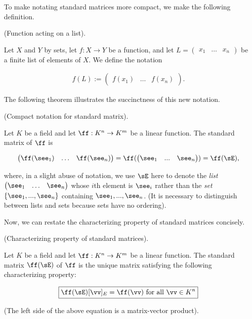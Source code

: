 To make notating standard matrices more compact, we make the following definition.

\begin{defn}
\label{ch::lin_alg::defn::linear_fn_acts_on_vectors}
    (Function acting on a list).
    
    Let $X$ and $Y$ by sets, let $f:X \rightarrow Y$ be a function, and let $L = \begin{pmatrix} x_1 & \hdots & x_n \end{pmatrix}$ be a finite list of elements of $X$. We define the notation
    
    \begin{align*}
        f(L) := \begin{pmatrix} f(x_1) & \hdots & f(x_n) \end{pmatrix}.
    \end{align*}
\end{defn}

The following theorem illustrates the succinctness of this new notation.

\begin{theorem}
    (Compact notation for standard matrix).
    
    Let $K$ be a field and let $\ff:K^n \rightarrow K^m$ be a linear function. The standard matrix of $\ff$ is
    
    \begin{align*}
        \begin{pmatrix} \ff(\see_1) & \hdots & \ff(\see_n) \end{pmatrix} = \ff(\begin{pmatrix} \see_1 & ... & \see_n \end{pmatrix}) = \ff(\sE),
    \end{align*}
    
    where, in a slight abuse of notation, we use $\sE$ here to denote the \textit{list} $\begin{pmatrix} \see_1 & \hdots & \see_n \end{pmatrix}$ whose $i$th element is $\see_i$ rather than the \textit{set} $\{\see_1, ..., \see_n\}$ containing $\see_1, ..., \see_n$. (It is necessary to distinguish between lists and sets because sets have no ordering).
\end{theorem}

Now, we can restate the characterizing property of standard matrices concisely.

\begin{theorem}
    (Characterizing property of standard matrices).
    \label{ch::lin_alg::thm::characterizing_property_of_standard_matrix}
    
    Let $K$ be a field and let $\ff:K^n \rightarrow K^m$ be a linear function. The standard matrix $\ff(\sE)$ of $\ff$ is the unique matrix satisfying the following characterizing property:
    
    \begin{align*}
        \boxed{
            \ff(\sE) [\vv]_E = \ff(\vv) \text{ for all $\vv \in K^n$}
        }
    \end{align*}
    
    (The left side of the above equation is a matrix-vector product).
\end{theorem}


